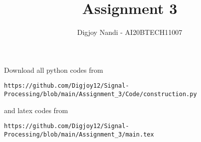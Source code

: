 \documentclass[journal,12pt,twocolumn]{IEEEtran}
\DeclareMathOperator*{\Res}{Res}
\begin{document}
\newcommand{\BEQA}{\begin{eqnarray}}
\newcommand{\EEQA}{\end{eqnarray}}
\newcommand{\define}{\stackrel{\triangle}{=}}

\raggedbottom
\setlength{\parindent}{0pt}
\providecommand{\mbf}{\mathbf}
\providecommand{\pr}[1]{\ensuremath{\Pr\left(#1\right)}}
\providecommand{\qfunc}[1]{\ensuremath{Q\left(#1\right)}}
\providecommand{\sbrak}[1]{\ensuremath{{}\left[#1\right]}}
\providecommand{\lsbrak}[1]{\ensuremath{{}\left[#1\right.}}
\providecommand{\rsbrak}[1]{\ensuremath{{}\left.#1\right]}}
\providecommand{\brak}[1]{\ensuremath{\left(#1\right)}}
\providecommand{\lbrak}[1]{\ensuremath{\left(#1\right.}}
\providecommand{\rbrak}[1]{\ensuremath{\left.#1\right)}}
\providecommand{\cbrak}[1]{\ensuremath{\left\{#1\right\}}}
\providecommand{\lcbrak}[1]{\ensuremath{\left\{#1\right.}}
\providecommand{\rcbrak}[1]{\ensuremath{\left.#1\right\}}}
\theoremstyle{remark}
\newtheorem{rem}{Remark}
\newcommand{\sgn}{\mathop{\mathrm{sgn}}}
\providecommand{\abs}[1]{\vert#1\vert}
\providecommand{\res}[1]{\Res\displaylimits_{#1}} 
\providecommand{\norm}[1]{\lVert#1\rVert}
\providecommand{\mtx}[1]{\mathbf{#1}}
\providecommand{\mean}[1]{E[ #1 ]}
\providecommand{\fourier}{\overset{\mathcal{F}}{ \rightleftharpoons}}
\providecommand{\system}{\overset{\mathcal{H}}{ \longleftrightarrow}}
\newcommand{\solution}{\noindent \textbf{Solution: }}
\newcommand{\cosec}{\,\text{cosec}\,}
\providecommand{\dec}[2]{\ensuremath{\overset{#1}{\underset{#2}{\gtrless}}}}
\newcommand{\myvec}[1]{\ensuremath{\begin{pmatrix}#1\end{pmatrix}}}
\newcommand{\mydet}[1]{\ensuremath{\begin{vmatrix}#1\end{vmatrix}}}
\makeatletter
{}
\makeatother
\let\StandardTheFigure\thefigure
\let\vec\mathbf
\renewcommand{\thefigure}{\theproblem}
\def\putbox#1#2#3{\makebox[0in][l]{\makebox[#1][l]{}\raisebox{\baselineskip}[0in][0in]{\raisebox{#2}[0in][0in]{#3}}}}
     \def\rightbox#1{\makebox[0in][r]{#1}}
     \def\centbox#1{\makebox[0in]{#1}}
     \def\topbox#1{\raisebox{-\baselineskip}[0in][0in]{#1}}
     \def\midbox#1{\raisebox{-0.5\baselineskip}[0in][0in]{#1}}
\vspace{3cm}
\title{Assignment 3}
\author{Digjoy Nandi - AI20BTECH11007}
\maketitle
\newpage
\bigskip
\renewcommand{\thefigure}{\theenumi}
\renewcommand{\thetable}{\theenumi}
Download all python codes from 
\begin{lstlisting}
https://github.com/Digjoy12/Signal-Processing/blob/main/Assignment_3/Code/construction.py
\end{lstlisting}
%
and latex codes from 
%
\begin{lstlisting}
https://github.com/Digjoy12/Signal-Processing/blob/main/Assignment_3/main.tex
\end{lstlisting}
\end{document}
